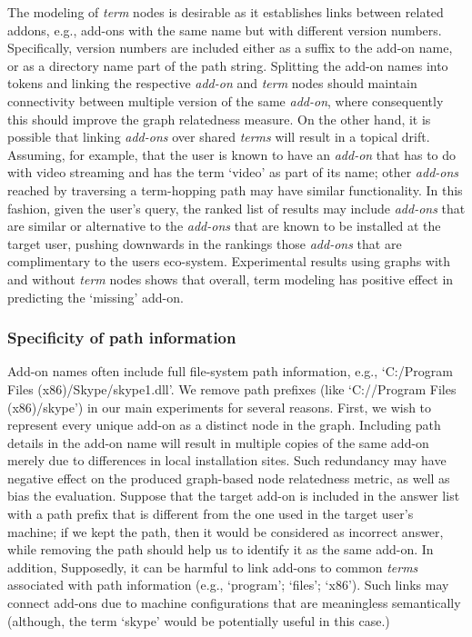 \documentclass[11pt,oneside]{book}
\let\Oldsubsubsection\subsubsection
\renewcommand{\subsubsection}{\FloatBarrier\Oldsubsubsection}
\begin{document}
The modeling of {\it term} nodes is desirable as it establishes links between related addons, e.g., add-ons with the same name but with different version numbers. Specifically, version numbers are included either as a suffix to the add-on name, or as a directory name part of the path string. Splitting the add-on names into tokens and linking the respective {\it add-on} and {\it term} nodes should maintain connectivity between multiple version of the same {\it add-on}, where consequently this should improve the graph relatedness measure. On the other hand, it is possible that linking {\it add-ons} over shared {\it terms} will result in a topical drift. Assuming, for example, that the user is known to have an {\it add-on} that has to do with video streaming and has the term `video' as part of its name; other {\it add-ons} reached by traversing a term-hopping path may have similar functionality. In this fashion, given the user's query, the ranked list of results may include {\it add-ons} that are similar or alternative to the {\it add-ons} that are known to be installed at the target user, pushing downwards in the rankings those {\it add-ons} that are complimentary to the users eco-system. Experimental results using graphs with and without {\it term} nodes shows that overall, term modeling has positive effect in predicting the `missing' add-on.

\subsubsection{Specificity of path information} 

Add-on names often include full file-system path information, e.g., `C:/Program Files (x86)/Skype/skype1.dll'. We remove path prefixes (like `C://Program Files (x86)/skype') in our main experiments for several reasons. First, we wish to represent every unique add-on as a distinct node in the graph. Including path details in the add-on name will result in multiple copies of the same add-on merely due to differences in local installation sites. Such redundancy may have negative effect on the produced  graph-based node relatedness metric, as well as bias the evaluation. Suppose that the target add-on is included in the answer list with a path prefix that is different from the one used in the target user's machine; if we kept the path, then it would be considered as incorrect answer, while removing the path should help us to identify it as the same add-on. In addition, Supposedly, it can be harmful to link add-ons to common {\it terms} associated with path information (e.g., `program'; `files'; `x86'). Such links may connect add-ons due to machine configurations that are meaningless semantically (although, the term `skype' would be potentially useful in this case.)
\end{document}
